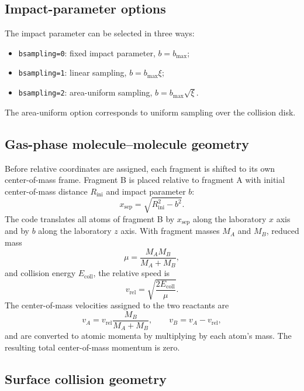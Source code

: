 \documentclass[11pt]{article}
\begin{document}
\subsection{Impact-parameter options}

The impact parameter can be selected in three ways:
\begin{itemize}
  \item \texttt{bsampling=0}: fixed impact parameter, $b=b_{\max}$;
  \item \texttt{bsampling=1}: linear sampling, $b=b_{\max}\xi$;
  \item \texttt{bsampling=2}: area-uniform sampling, $b=b_{\max}\sqrt{\xi}$.
\end{itemize}
The area-uniform option corresponds to uniform sampling over the collision disk.

\subsection{Gas-phase molecule--molecule geometry}

Before relative coordinates are assigned, each fragment is shifted to its own center-of-mass frame.  Fragment B is placed relative to fragment A with initial center-of-mass distance $R_{\mathrm{ini}}$ and impact parameter $b$:
\begin{equation}
  x_{\mathrm{sep}} = \sqrt{R_{\mathrm{ini}}^2-b^2}.
\end{equation}
The code translates all atoms of fragment B by $x_{\mathrm{sep}}$ along the laboratory $x$ axis and by $b$ along the laboratory $z$ axis.  With fragment masses $M_A$ and $M_B$, reduced mass
\begin{equation}
  \mu = \frac{M_A M_B}{M_A+M_B},
\end{equation}
and collision energy $E_{\mathrm{coll}}$, the relative speed is
\begin{equation}
  v_{\mathrm{rel}} = \sqrt{\frac{2E_{\mathrm{coll}}}{\mu}}.
\end{equation}
The center-of-mass velocities assigned to the two reactants are
\begin{equation}
  v_A = v_{\mathrm{rel}}\frac{M_B}{M_A+M_B},
  \qquad
  v_B = v_A-v_{\mathrm{rel}},
\end{equation}
and are converted to atomic momenta by multiplying by each atom's mass.  The resulting total center-of-mass momentum is zero.

\subsection{Surface collision geometry}
\end{document}
